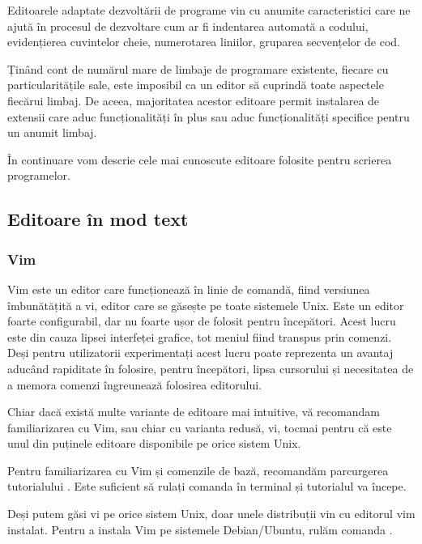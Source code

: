 Editoarele adaptate dezvoltării de programe vin cu anumite caracteristici care
ne ajută în procesul de dezvoltare cum ar fi indentarea automată a codului, evidențierea cuvintelor cheie, numerotarea liniilor, gruparea secvențelor de cod.

Ținând cont de numărul mare de limbaje de programare existente, fiecare cu
particularitățile sale, este imposibil ca un editor să cuprindă toate aspectele
fiecărui limbaj. De aceea, majoritatea acestor editoare permit instalarea de
extensii care aduc funcționalități în plus sau aduc funcționalități specifice
pentru un anumit limbaj.

În continuare vom descrie cele mai cunoscute editoare folosite pentru scrierea
programelor.

\subsection{Editoare în mod text}
\label{sec:appdev:dev-stages:editor}

\subsubsection{Vim}
\label{sec:appdev:dev-stages:editor:vim}

Vim este un editor care funcționează în linie de comandă, fiind versiunea
îmbunătățită a vi, editor care se găsește pe toate sistemele Unix. Este un editor foarte configurabil, dar nu foarte ușor de
folosit pentru începători. Acest lucru este din cauza lipsei interfeței grafice,
tot meniul fiind transpus prin comenzi. Deși pentru utilizatorii experimentați
acest lucru poate reprezenta un avantaj aducând rapiditate în folosire, pentru
începători, lipsa cursorului și necesitatea de a memora comenzi îngreunează
folosirea editorului.

Chiar dacă există multe variante de editoare mai intuitive, vă recomandam
familiarizarea cu Vim, sau chiar cu varianta redusă, vi, tocmai pentru că este
unul din puținele editoare disponibile pe orice sistem Unix.

Pentru familiarizarea cu Vim și comenzile de bază, recomandăm parcurgerea
tutorialului . Este suficient să rulați comanda  în terminal și
tutorialul va începe.

Deși putem găsi vi pe orice sistem Unix, doar unele distribuții vin cu editorul
vim instalat. Pentru a instala Vim pe sistemele Debian/Ubuntu, rulăm comanda .

